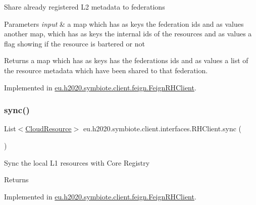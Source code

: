 Share already registered L2 metadata to federations


\begin{DoxyParams}{Parameters}
{\em input} & a map which has as keys the federation ids and as values another map, which has as keys the internal ids of the resources and as values a flag showing if the resource is bartered or not \\
\hline
\end{DoxyParams}
\begin{DoxyReturn}{Returns}
a map which has as keys has the federations ids and as values a list of the resource metadata which have been shared to that federation. 
\end{DoxyReturn}


Implemented in \hyperlink{classeu_1_1h2020_1_1symbiote_1_1client_1_1feign_1_1FeignRHClient_a2ad028004364f0068c760134a25956b0}{eu.\+h2020.\+symbiote.\+client.\+feign.\+Feign\+R\+H\+Client}.

\mbox{\label{interfaceeu_1_1h2020_1_1symbiote_1_1client_1_1interfaces_1_1RHClient_ae450ac97070e6968eb9d1bfcfd3ae3e6}} 
\subsubsection{\texorpdfstring{sync()}{sync()}}
{\footnotesize\ttfamily List$<$\hyperlink{classeu_1_1h2020_1_1symbiote_1_1cloud_1_1model_1_1internal_1_1CloudResource}{Cloud\+Resource}$>$ eu.\+h2020.\+symbiote.\+client.\+interfaces.\+R\+H\+Client.\+sync (\begin{DoxyParamCaption}{ }\end{DoxyParamCaption})}

Sync the local L1 resources with Core Registry

\begin{DoxyReturn}{Returns}

\end{DoxyReturn}


Implemented in \hyperlink{classeu_1_1h2020_1_1symbiote_1_1client_1_1feign_1_1FeignRHClient_a8181d6656e2c7dea2d01bc5ee16e8639}{eu.\+h2020.\+symbiote.\+client.\+feign.\+Feign\+R\+H\+Client}.

